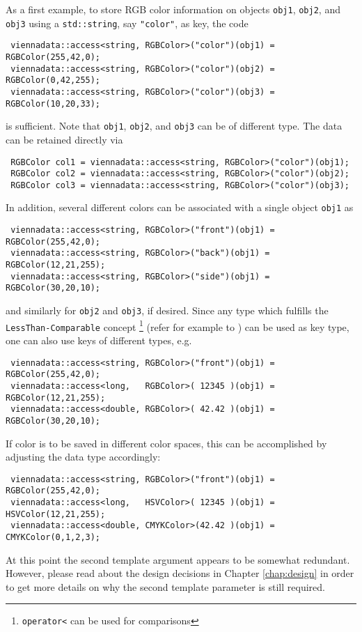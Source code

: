 As a first example, to store RGB color information on objects \lstinline|obj1|, \lstinline|obj2|, and \lstinline|obj3| using a \lstinline|std::string|, say \lstinline|"color"|, as key,
the code
\begin{lstlisting}
 viennadata::access<string, RGBColor>("color")(obj1) = RGBColor(255,42,0);
 viennadata::access<string, RGBColor>("color")(obj2) = RGBColor(0,42,255);
 viennadata::access<string, RGBColor>("color")(obj3) = RGBColor(10,20,33);
\end{lstlisting}
is sufficient. Note that \lstinline|obj1|, \lstinline|obj2|, and \lstinline|obj3| can be of different type.
The data can be retained directly via
\begin{lstlisting}
 RGBColor col1 = viennadata::access<string, RGBColor>("color")(obj1);
 RGBColor col2 = viennadata::access<string, RGBColor>("color")(obj2);
 RGBColor col3 = viennadata::access<string, RGBColor>("color")(obj3);
\end{lstlisting}
In addition, several different colors can be associated with a single object \lstinline|obj1|
as
\begin{lstlisting}
 viennadata::access<string, RGBColor>("front")(obj1) = RGBColor(255,42,0);
 viennadata::access<string, RGBColor>("back")(obj1) = RGBColor(12,21,255);
 viennadata::access<string, RGBColor>("side")(obj1) = RGBColor(30,20,10);
\end{lstlisting}
and similarly for \lstinline|obj2| and \lstinline|obj3|, if desired.
 Since any type which fulfills the \lstinline|LessThan-Comparable| concept
\footnote{\lstinline|operator<| can be used for comparisons} (refer for example to \cite{Austern:GenericProgrammingSTL}) can be used as key type, one can also use keys of different types, e.g.
\begin{lstlisting}
 viennadata::access<string, RGBColor>("front")(obj1) = RGBColor(255,42,0);
 viennadata::access<long,   RGBColor>( 12345 )(obj1) = RGBColor(12,21,255);
 viennadata::access<double, RGBColor>( 42.42 )(obj1) = RGBColor(30,20,10);
\end{lstlisting}
If color is to be saved in different color spaces, this can be accomplished by adjusting the data type accordingly:
\begin{lstlisting}
 viennadata::access<string, RGBColor>("front")(obj1) = RGBColor(255,42,0);
 viennadata::access<long,   HSVColor>( 12345 )(obj1) = HSVColor(12,21,255);
 viennadata::access<double, CMYKColor>(42.42 )(obj1) = CMYKColor(0,1,2,3);
\end{lstlisting}
At this point the second template argument appears to be somewhat redundant.
However, please read about the design decisions in Chapter \ref{chap:design} in order to get more details on why the second template parameter is still required.


